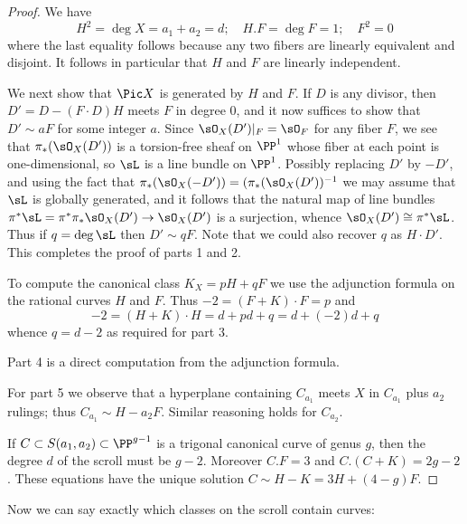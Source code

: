 \begin{proof}
We have 
$$
H^2 = \deg X = a_1+a_2 = d; \quad H.F = \deg F = 1; \quad F^2 = 0
$$
where the last equality follows because any two fibers are linearly equivalent and disjoint.
It follows in particular that $H$ and $F$ are linearly independent.

We next show that $\Pic X$ is generated by $H$ and $F$. If $D$ is any divisor,
then $D' = D - (F\cdot D)H$ meets $F$ in degree 0, and it now suffices to show that $D'\sim aF$ for
some integer $a$.
Since $\sO_X(D')|_F = \sO_F$ for any fiber $F$, we see that
$\pi_*(\sO_X(D'))$ is a torsion-free sheaf on $\PP^1$ whose fiber at each point is one-dimensional, 
so $\sL$ is a line bundle on $\PP^1$.  Possibly replacing $D'$ by $-D'$, and using the fact that
$\pi_*(\sO_X(-D')) = (\pi_*(\sO_X(D'))^{-1}$ we may assume that $\sL$ is globally generated, and it follows that  the natural map of line bundles $\pi^*\sL = \pi^*\pi_* \sO_X(D') \to \sO_X(D') $ is a surjection, whence 
$\sO_X(D') \cong \pi^*\sL$. Thus if $q = \deg \sL$ then
$D' \sim qF$. Note that we could also recover $q$ as $H\cdot D'$. This completes the proof of parts
1 and 2.

To compute the canonical class $K_X = pH+qF$ we use the adjunction formula on the rational curves
$H$ and $F$. Thus $-2 = (F+K)\cdot F = p $ and 
$$
-2 = (H+K)\cdot H = d + pd+q = d + (-2)d+q
$$
whence $q = d-2$ as required for part 3.
 
 Part 4 is a direct computation from the adjunction formula.
 
For part 5 we observe that a hyperplane containing $C_{a_1}$ meets $X$ in $C_{a_1}$ plus
$a_2$ rulings; thus $C_{a_1}\sim H-a_2F$. Similar reasoning holds for $C_{a_{2}}$.

If  $C \subset S(a_{1}, a_{2}) \subset \PP^{g-1}$ is a  trigonal canonical curve of genus $g$, then the degree
$d$ of the scroll must be $g-2$. Moreover $C.F=3$ and $C.(C+K) = 2g-2$. These equations have the unique solution
$C \sim H-K = 3H + (4-g)F.$
\end{proof}

Now we can say exactly which classes on the scroll contain curves:

